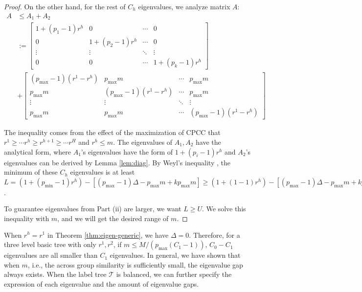 \begin{proof}
    On the other hand, for the rest of $C_h$ eigenvalues, we analyze matrix $A$:
    \begin{align*}
        A &\leq A_1 + A_2 \\
          &:=
        \begin{bmatrix}
        1 + (p_1 - 1)r^h & 0 & \cdots & 0 \\
        0 & 1 + (p_2 - 1)r^h & \cdots & 0 \\
        \vdots & \vdots & \ddots & \vdots \\
        0 & 0 & \cdots & 1 + (p_k - 1)r^h
        \end{bmatrix}\\
        &+ \begin{bmatrix}
(p_{\text{max}} - 1)(r^1 - r^h) & p_{\text{max}}m & \cdots & p_{\text{max}}m \\
p_{\text{max}}m & (p_{\text{max}} - 1)(r^1 - r^h) & \cdots & p_{\text{max}}m \\
\vdots & \vdots & \ddots & \vdots \\
p_{\text{max}}m & p_{\text{max}}m & \cdots & (p_{\text{max}} - 1)(r^1 - r^h)
\end{bmatrix}
    \end{align*}

   The inequality comes from the effect of the maximization of CPCC that $r^1 \geq \cdots r^h \geq r^{h+1} \geq \cdots r^H$ and $r^h \leq m$. The eigenvalues of $A_1, A_2$ have the analytical form, where $A_1$'s eigenvalues have the form of $1 + (p_i - 1)r^h$ and $A_2$'s eigenvalues can be derived by Lemma \ref{lem:diag}. By Weyl's inequality \citep{Weyl_1912}, the minimum of these $C_h$ eigenvalues is at least $L = (1 + (p_\text{min} - 1)r^h) - [(p_\text{max} - 1)\Delta - p_\text{max}m + kp_\text{max}m] \geq (1 + (1 - 1)r^h) - [(p_\text{max} - 1)\Delta - p_\text{max}m + kp_\text{max}m]$.

    To guarantee eigenvalues from Part (ii) are larger, we want $L \geq U$. We solve this inequality with $m$, and we will get the desired range of $m$.
\end{proof}

When $r^h = r^1$ in Theorem \ref{thm:eigen-generic}, we have $\Delta = 0$. Therefore, for a three level basic tree with only $r^1, r^2$, if $m \leq M/(p_\text{max}(C_1-1))$, $C_0 - C_1$ eigenvalues are all smaller than $C_1$ eigenvalues. In general, we have shown that when $m$, i.e., the across group similarity is sufficiently small, the eigenvalue gap always exists. When the label tree $\mathcal{T}$ is balanced, we can further specify the expression of each eigenvalue and the amount of eigenvalue gaps.


